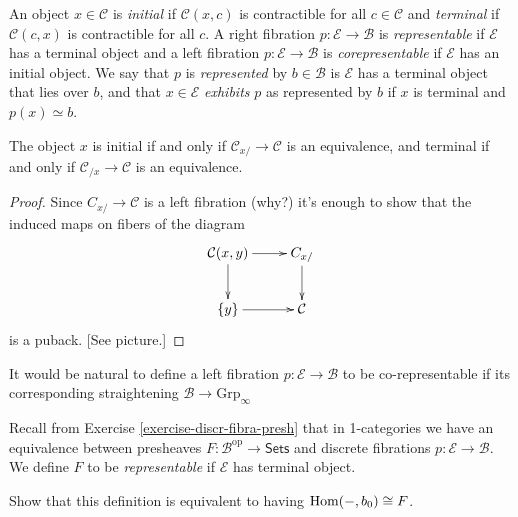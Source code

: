 \noindent
An object $x \in \mathcal{C}$ is {\it initial
} if $\mathcal{C}(x,c)$
is contractible for all $c \in \mathcal{C}$
and
{\it terminal} if $\mathcal{C}(c,x)$ is
contractible for all $c$.
A right fibration $p:\mathcal{E} \to
\mathcal{B}$ is
{\it representable} if $\mathcal{E}$ has a
terminal object
and a left fibration $p:\mathcal{E} \to
\mathcal{B}$ is
{\it corepresentable} if $\mathcal{E}$ has an
initial object.
We say that $p$ is {\it represented} by $b
\in \mathcal{B}$
is $\mathcal{E}$ has a terminal object that
lies over $b$,
and that $x \in \mathcal{E}$ {\it exhibits}
$p$
as represented by $b$ if $x$ is terminal
and $p(x)\simeq b$.

\begin{lemma}
\label{lemma-equivalence-iff-initial}
The object $x$ is initial if and only if
$\mathcal{C}_{x/}\to \mathcal{C}$
is an equivalence, and terminal if and only
if $\mathcal{C}_{/x}\to \mathcal{C}$
is an equivalence.
\end{lemma}

\begin{proof}
Since $C_{x/}\to \mathcal{C}$ is a left
fibration (why?)
it's enough to show that the induced maps on
fibers of
the diagram
$$
\xymatrix{
\mathcal{C}(x,y)\ar[r]\ar[d]&C_{x/}\ar[d]\\
\{y\}\ar[r]&\mathcal{C}
}
$$
is a puback. [See picture.]
\end{proof}

\medskip\noindent
It would be natural to define a left
fibration $p:\mathcal{E} \to \mathcal{B}$
to be co-representable if its corresponding
straightening
$\mathcal{B} \to \text{Grp}_{\infty}$

Recall from
Exercise \ref{exercise-discr-fibra-presh}
that in 1-categories we have an equivalence
between presheaves
$F:\mathcal{B}^{\text{op}}\to \mathsf{Sets}$
and discrete fibrations $p:\mathcal{E} \to
\mathcal{B}$.
We define $F$ to be {\it representable} if
$\mathcal{E}$
has terminal object.

\begin{exercise}
\label{exercise-duplicate-2}
Show that this definition is equivalent to
having $\mathop{\mathrm{Hom}}\nolimits(-,b_0) \cong F$.
\end{exercise}

